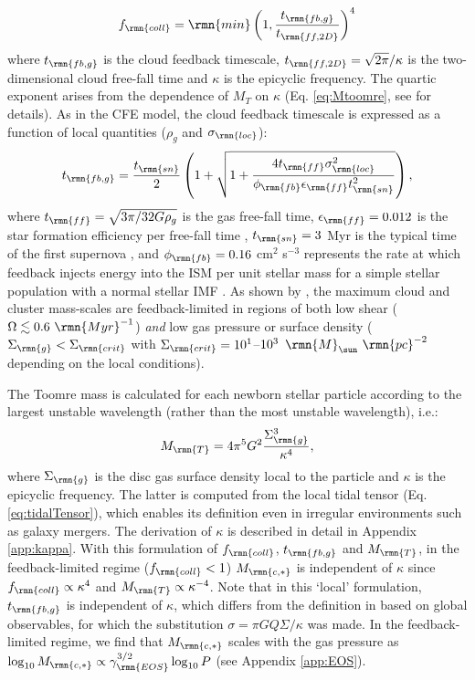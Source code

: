 \documentclass[fleqn,usenatbib]{mnras}
\newcommand\Msun{\,\rmn{M}_{\sun}}
\newcommand{\Mcstar}{M_\rmn{c,\ast}}
\newcommand{\Mtoomre}{M_\rmn{T}}
\begin{document}
\begin{equation} \label{eq:f_coll}
f_\rmn{coll} = \rmn{min} \left( 1 , \frac{ t_\rmn{fb,g} }{ t_\rmn{ff,2D} } \right)^4
\end{equation}
where $t_\rmn{fb,g}$ is the cloud feedback timescale, $t_\rmn{ff,2D} = \sqrt{2 \pi}/\kappa$ is the two-dimensional cloud free-fall time and $\kappa$ is the epicyclic frequency. The quartic exponent arises from the dependence of $M_T$ on $\kappa$ (Eq. \ref{eq:Mtoomre}, see \citealt{Reina-Campos_and_Kruijssen_17} for details).
As in the CFE model, the cloud feedback timescale is expressed as a function of local quantities ($\rho_g$ and $\sigma_\rmn{loc}$):
\begin{equation} \label{eq:t_fb}
t_\rmn{fb,g} = \frac{t_\rmn{sn}}{2} \left( 1 + \sqrt{ 1 + \frac{4 t_\rmn{ff} \sigma_\rmn{loc}^2} {\phi_\rmn{fb} \epsilon_\rmn{ff} t_\rmn{sn}^2} } \right) , 
\end{equation}
where $t_\rmn{ff} = \sqrt{3 \pi / 32 G \rho_g}$ is the gas free-fall time, $\epsilon_\rmn{ff} = 0.012$ is the star formation efficiency per free-fall time \citep{Elmegreen_02}, $t_\rmn{sn} = 3$ Myr is the typical time of the first supernova \citep[e.g.][]{Ekstrom_et_al_12}, and $\phi_\rmn{fb} = 0.16$ cm$^2$ s$^{-3}$ represents the rate at which feedback injects energy into the ISM per unit stellar mass for a simple stellar population with a normal stellar IMF \citep[see Appendix~B of][]{Kruijssen_12}. As shown by \citet[Figure~3]{Reina-Campos_and_Kruijssen_17}, the maximum cloud and cluster mass-scales are feedback-limited in regions of both low shear ($\Omega\lesssim 0.6~\rmn{Myr}^{-1}$) {\it and} low gas pressure or surface density ($\Sigma_\rmn{g}<\Sigma_\rmn{crit}$ with $\Sigma_\rmn{crit}=10^1$--$10^3~\Msun~\rmn{pc}^{-2}$ depending on the local conditions).

The Toomre mass is calculated for each newborn stellar particle according to the largest unstable wavelength (rather than the most unstable wavelength), i.e.:
\begin{equation} \label{eq:Mtoomre}
\Mtoomre = 4 \pi^5 G^2 \frac{\Sigma_\rmn{g}^3}{\kappa^4} ,
\end{equation}
where $\Sigma_\rmn{g}$ is the disc gas surface density local to the particle and $\kappa$ is the epicyclic frequency. The latter is computed from the local tidal tensor (Eq. \ref{eq:tidalTensor}), which enables its definition even in irregular environments such as galaxy mergers. The derivation of $\kappa$ is described in detail in Appendix \ref{app:kappa}. With this formulation of $f_\rmn{coll}$, $t_\rmn{fb,g}$ and $\Mtoomre$, in the feedback-limited regime ($f_\rmn{coll} < 1$) $\Mcstar$ is independent of $\kappa$ since $f_\rmn{coll} \propto \kappa^4$ and $\Mtoomre \propto \kappa^{-4}$. Note that in this `local' formulation, $t_\rmn{fb,g}$ is independent of $\kappa$, which differs from the definition in \citet{Reina-Campos_and_Kruijssen_17} based on global observables, for which the substitution $\sigma=\pi GQ\Sigma/\kappa$ was made. In the feedback-limited regime, we find that $\Mcstar$ scales with the gas pressure as $\log_{10} \Mcstar \propto \gamma_\rmn{EOS}^{3/2} \log_{10} P$ (see Appendix \ref{app:EOS}).
\end{document}
